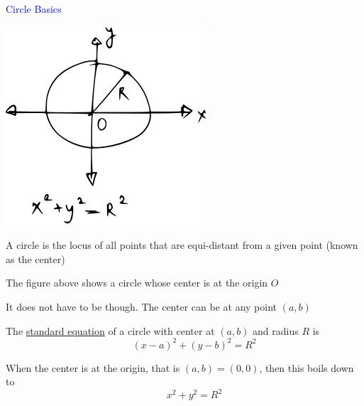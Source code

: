 \documentclass[14pt,fleqn]{extarticle}
\begin{document}
 
\begin{skill}
    \begin{narrow}
\textcolor{blue}{Circle Basics} 
 
    \end{narrow}
    
    \reason 
    
    \begin{center}
\includegraphics[scale=1.5]{circle.svg} 
\end{center} 

A circle is the locus of all points that are equi-distant from a given point (known as the center) \newline 

The figure above shows a circle whose center is at the origin $O$\newline 

It does not have to be though. The center can be at any point $(a,b)$\newline 

The \underline{standard equation} of a circle with center at $(a,b)$ and radius $R$   is 
\[ \qquad \left(x-a \right)^2 + \left(y-b \right)^2 = R^2 \]

When the center is at the origin, that is $(a,b) = (0,0)$, then this boils down to 
\[ \qquad x^2 + y^2 = R^2 \]
\end{skill}
\end{document}
